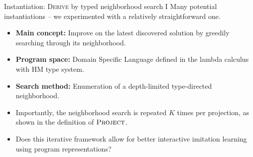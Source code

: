 \note[itemize]{
    \item 
}

\begin{frame}{Instantiation: \textsc{Derive} by typed neighborhood search I}
    Many potential instantiations -- we experimented with a relatively straightforward one.
    \begin{itemize}
        \item \textbf{Main concept:} Improve on the latest discovered solution by greedily searching through its neighborhood.
        \item \textbf{Program space:} Domain Specific Language defined in the lambda calculus with HM type system.
        \item \textbf{Search method:} Enumeration of a depth-limited type-directed neighborhood.
        \item Importantly, the neighborhood search is repeated $K$ times per projection, as shown in the definition of $\textsc{Project}$.
        \item Does this iterative framework allow for better interactive imitation learning using program representations?
    \end{itemize}
\end{frame}

